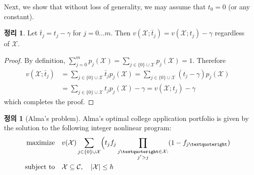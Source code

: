 \documentclass[12pt]{article} %
\newtheorem{theorem}{Theorem}
\theoremstyle{definition}
\newtheorem{definition}{Definition}
\newtheorem{theorem}{정리}
\theoremstyle{definition}
\newtheorem{definition}{정의}
\begin{document}
Next, we show that without loss of generality, we may assume that $t_0 = 0$ (or any constant).
\begin{theorem} \label{assumetzerozero}
Let $\bar t_j = t_j - \gamma$ for $j = 0 \dots m$. Then $v(\mathcal{X}; \bar t_j) = v(\mathcal{X};  t_j) -  \gamma$ regardless of $\mathcal{X}$. 
\end{theorem}
\begin{proof}
By definition, $\sum_{j=0}^m p_j(\mathcal{X}) = \sum_{j \in \{0\}\cup\mathcal{X}} p_j(\mathcal{X}) = 1$. Therefore
\begin{align}
v(\mathcal{X}; \bar t_j) &= \sum_{j\in \{0\}\cup\mathcal{X}}  \bar t_j p_j(\mathcal{X})
=\sum_{j\in \{0\}\cup\mathcal{X}} (t_j - \gamma) p_j(\mathcal{X}) \\
&=\sum_{j\in \{0\}\cup\mathcal{X}} t_j p_j(\mathcal{X})  - \gamma 
= v(\mathcal{X}; t_j) - \gamma
\end{align}
which completes the proof. 
\end{proof}

\begin{definition}[Alma’s problem]
Alma's optimal college application portfolio is given by the solution to the following integer nonlinear program:
\begin{align}
\begin{split}
\text{maximize}\quad &  v(\mathcal{X}) \sum_{j\in\{0\}\cup\mathcal{X}} \Bigl( t_j f_j  \prod_{\substack{j’ \in \mathcal{X}: \\ j' > j}} (1 - f_{j’})\\
\text{subject to}\quad & \mathcal{X}\subseteq\mathcal{C}, \quad|\mathcal{X}| \leq h 
\end{split}
\end{align}
\end{definition}
\end{document}
